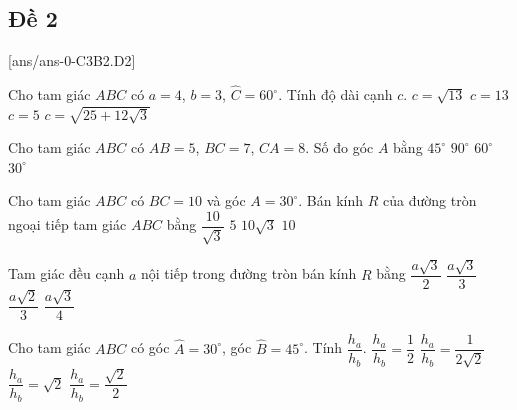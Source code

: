 \subsection{Đề 2}
[ans/ans-0-C3B2.D2]
\caulc
\begin{ex}%
	Cho tam giác $ABC$ có $a=4$, $b=3$, $\widehat C=60^\circ$. Tính độ dài cạnh $c$.
	\choice
	{\True $c=\sqrt{13}$}
	{$c=13$}
	{$c=5$}
	{$c=\sqrt{25+12\sqrt 3}$}
\end{ex}
\begin{ex}%
	Cho tam giác $ABC$ có $AB=5$, $BC=7$, $CA=8$. Số đo góc $A$ bằng
	\choice
	{$45^\circ $}
	{$90^\circ $}
	{\True $60^\circ $}
	{$30^\circ $}
\end{ex}
\begin{ex}%
	Cho tam giác $ABC$ có $BC=10$ và góc $A=30^\circ$. Bán kính $R$ của đường tròn ngoại tiếp tam giác $ABC$ bằng
	\choice
	{$\dfrac{10}{\sqrt 3}$}
	{$5$}
	{$10\sqrt 3 $}
	{\True $10$}
\end{ex}
\begin{ex}%
	Tam giác đều cạnh $a$ nội tiếp trong đường tròn bán kính $R$ bằng
	\choice
	{$\dfrac{a\sqrt 3}{2}$}
	{\True $\dfrac{a\sqrt 3}{3}$}
	{$\dfrac{a\sqrt 2}{3}$}
	{$\dfrac{a\sqrt 3}{4}$}
\end{ex}
\begin{ex}%
	Cho tam giác $ABC$ có góc $\widehat A=30^\circ$, góc $\widehat B=45^\circ$. Tính $\dfrac{h_a}{h_b}$.
	\choice
	{$\dfrac{h_a}{h_b}=\dfrac{1}{2}$}
	{$\dfrac{h_a}{h_b}=\dfrac{1}{2\sqrt 2}$}
	{\True $\dfrac{h_a}{h_b}=\sqrt 2 $}
	{$\dfrac{h_a}{h_b}=\dfrac{\sqrt 2}{2}$}
\end{ex}
